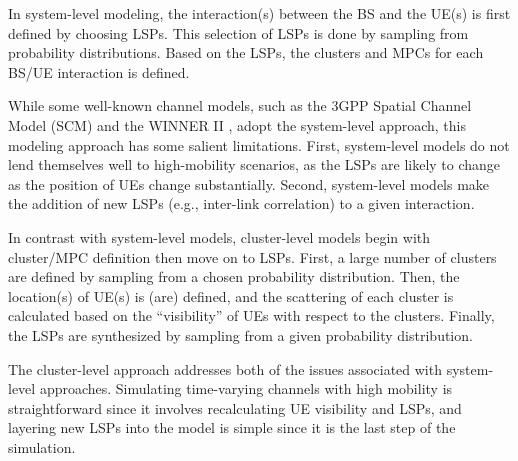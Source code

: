 In system-level modeling, the interaction(s) between the BS and the UE(s) is first defined by choosing LSPs. This selection of LSPs is done by sampling from probability distributions. Based on the LSPs, the clusters and MPCs for each BS/UE interaction is defined.

While some well-known channel models, such as the 3GPP Spatial Channel Model (SCM) \cite{ref:kyosti2007winner} and the WINNER II \cite{ref:kyosti2007winner}, adopt the system-level approach, this modeling approach has some salient limitations. First, system-level models do not lend themselves well to high-mobility scenarios, as the LSPs are likely to change as the position of UEs change substantially. Second, system-level models make the addition of new LSPs (e.g., inter-link correlation) to a given interaction.

In contrast with system-level models, cluster-level models begin with cluster/MPC definition then move on to LSPs. First, a large number of clusters are defined by sampling from a chosen probability distribution. Then, the location(s) of UE(s) is (are) defined, and the scattering of each cluster is calculated based on the ``visibility'' of UEs with respect to the clusters. Finally, the LSPs are synthesized by sampling from a given probability distribution.

The cluster-level approach addresses both of the issues associated with system-level approaches. Simulating time-varying channels with high mobility is straightforward since it involves recalculating UE visibility and LSPs, and layering new LSPs into the model is simple since it is the last step of the simulation.

